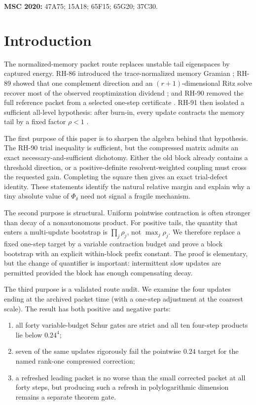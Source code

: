 \documentclass[11pt]{article}
\theoremstyle{definition}
\theoremstyle{remark}
\begin{document}
\medskip
\noindent\textbf{MSC 2020:} 47A75; 15A18; 65F15; 65G20; 37C30.

\section{Introduction}

The normalized-memory packet route replaces unstable tail eigenspaces by
captured energy.  RH-86 introduced the trace-normalized memory Gramian
\citep{WangMemory2026}; RH-89 showed that one complement direction and an
$(r+1)$-dimensional Ritz solve recover most of the observed reoptimization
dividend \citep{WangRitz2026}; and RH-90 removed the full reference packet
from a selected one-step certificate \citep{WangSchur2026}.  RH-91 then
isolated a sufficient all-level hypothesis: after burn-in, every update
contracts the memory tail by a fixed factor $\rho<1$
\citep{WangPacketReview2026}.

The first purpose of this paper is to sharpen the algebra behind that
hypothesis.  The RH-90 trial inequality is sufficient, but the compressed
matrix admits an exact necessary-and-sufficient dichotomy.  Either the old
block already contains a threshold direction, or a positive-definite
resolvent-weighted coupling must cross the requested gain.  Completing the
square then gives an exact trial-defect identity.  These statements identify
the natural relative margin and explain why a tiny absolute value of
$\Phi_\delta$ need not signal a fragile mechanism.

The second purpose is structural.  Uniform pointwise contraction is often
stronger than decay of a nonautonomous product.  For positive tails, the
quantity that enters a multi-update bootstrap is
$\prod_j\rho_j$, not $\max_j\rho_j$.  We therefore replace a fixed one-step
target by a variable contraction budget and prove a block bootstrap with an
explicit within-block prefix constant.  The proof is elementary, but the
change of quantifier is important: intermittent slow updates are permitted
provided the block has enough compensating decay.

The third purpose is a validated route audit.  We examine the four updates
ending at the archived packet time (with a one-step adjustment at the
coarsest scale).  The result has both positive and negative parts:

\begin{enumerate}[leftmargin=2em]
\item all forty variable-budget Schur gates are strict and all ten four-step
products lie below $0.24^4$;
\item seven of the same updates rigorously fail the pointwise $0.24$ target
for the named rank-one compressed correction;
\item a refreshed leading packet is no worse than the small corrected packet
at all forty steps, but producing such a refresh in polylogarithmic dimension
remains a separate theorem gate.
\end{enumerate}
\end{document}
